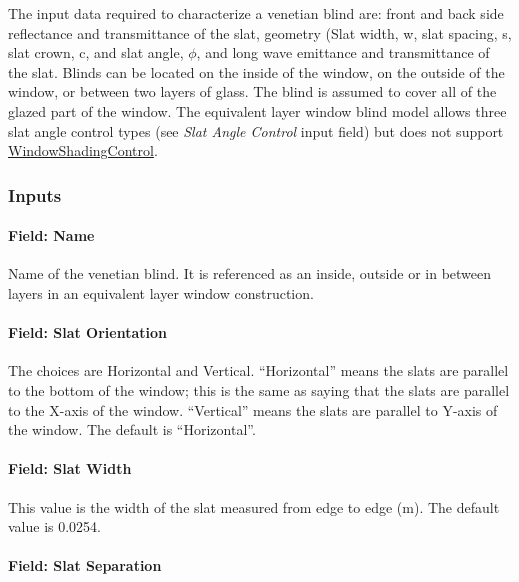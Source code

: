 The input data required to characterize a venetian blind are: front and back side reflectance and transmittance of the slat, geometry (Slat width, w, slat spacing, s, slat crown, c, and slat angle, $\phi$, and long wave emittance and transmittance of the slat. Blinds can be located on the inside of the window, on the outside of the window, or between two layers of glass. The blind is assumed to cover all of the glazed part of the window.
The equivalent layer window blind model allows three slat angle control types (see \textit{Slat Angle Control} input field) but does not support \hyperref[windowpropertyshadingcontrol]{WindowShadingControl}.

\subsubsection{Inputs}\label{inputs-28-001}

\paragraph{Field: Name}\label{field-name-22-003}

Name of the venetian blind. It is referenced as an inside, outside or in between layers in an equivalent layer window construction.

\paragraph{Field: Slat Orientation}\label{field-slat-orientation-1}

The choices are Horizontal and Vertical. ``Horizontal'' means the slats are parallel to the bottom of the window; this is the same as saying that the slats are parallel to the X-axis of the window. ``Vertical'' means the slats are parallel to Y-axis of the window. The default is ``Horizontal''.

\paragraph{Field: Slat Width}\label{field-slat-width-2}

This value is the width of the slat measured from edge to edge (m). The default value is 0.0254.

\paragraph{Field: Slat Separation}\label{field-slat-separation-1}

